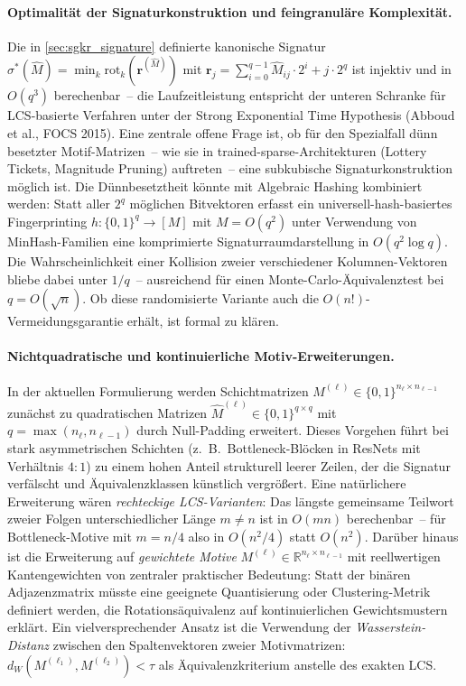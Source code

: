 ﻿\documentclass[12pt, a4paper, openany]{report}
\newcommand{\R}{\mathbb{R}}
\begin{document}
\paragraph{Optimalität der Signaturkonstruktion und feingranuläre Komplexität.}
Die in \cref{sec:sgkr_signature} definierte kanonische Signatur
$\sigma^*(\hat{M}) = \min_{k} \mathrm{rot}_k(\bm{r}^{(\hat{M})})$ mit
$\bm{r}_j = \sum_{i=0}^{q-1} \hat{M}_{ij}\cdot 2^i + j\cdot 2^q$
ist injektiv und in $O(q^3)$ berechenbar~-- die Laufzeitleistung entspricht
der unteren Schranke für LCS-basierte Verfahren unter der Strong Exponential
Time Hypothesis (Abboud et al., FOCS 2015).  Eine zentrale offene Frage ist,
ob für den Spezialfall dünn besetzter Motif-Matrizen~-- wie sie in
trained-sparse-Architekturen (Lottery Tickets, Magnitude Pruning) auftreten~--
eine subkubische Signaturkonstruktion möglich ist.  Die Dünnbesetztheit könnte
mit Algebraic Hashing kombiniert werden: Statt aller $2^q$ möglichen
Bitvektoren erfasst ein universell-hash-basiertes Fingerprinting
$h\colon \{0,1\}^q \to [M]$ mit $M = O(q^2)$ unter Verwendung von
MinHash-Familien eine komprimierte Signaturraumdarstellung in $O(q^2\log q)$.
Die Wahrscheinlichkeit einer Kollision zweier verschiedener Kolumnen-Vektoren
bliebe dabei unter $1/q$~-- ausreichend für einen Monte-Carlo-Äquivalenztest
bei $q = O(\sqrt{n})$.  Ob diese randomisierte Variante auch die
$O(n!)$-Vermeidungsgarantie erhält, ist formal zu klären.

\paragraph{Nichtquadratische und kontinuierliche Motiv-Erweiterungen.}
In der aktuellen Formulierung werden Schichtmatrizen $M^{(\ell)} \in
\{0,1\}^{n_\ell \times n_{\ell-1}}$ zunächst zu quadratischen Matrizen
$\hat{M}^{(\ell)} \in \{0,1\}^{q\times q}$ mit $q = \max(n_\ell, n_{\ell-1})$
durch Null-Padding erweitert.  Dieses Vorgehen führt bei stark asymmetrischen
Schichten (z.~B.\ Bottleneck-Blöcken in ResNets mit Verhältnis $4:1$) zu
einem hohen Anteil strukturell leerer Zeilen, der die Signatur verfälscht
und Äquivalenzklassen künstlich vergrößert.  Eine natürlichere Erweiterung
wären \emph{rechteckige LCS-Varianten}: Das längste gemeinsame Teilwort
zweier Folgen unterschiedlicher Länge $m \neq n$ ist in $O(mn)$ berechenbar~--
für Bottleneck-Motive mit $m = n/4$ also in $O(n^2/4)$ statt $O(n^2)$.
Darüber hinaus ist die Erweiterung auf \emph{gewichtete Motive}
$M^{(\ell)} \in \R^{n_\ell \times n_{\ell-1}}$ mit reellwertigen
Kantengewichten von zentraler praktischer Bedeutung: Statt der binären
Adjazenzmatrix müsste eine geeignete Quantisierung oder Clustering-Metrik
definiert werden, die Rotationsäquivalenz auf kontinuierlichen Gewichtsmustern
erklärt.  Ein vielversprechender Ansatz ist die Verwendung der
\emph{Wasserstein-Distanz} zwischen den Spaltenvektoren zweier
Motivmatrizen: $d_W(M^{(\ell_1)}, M^{(\ell_2)}) < \tau$ als
Äquivalenzkriterium anstelle des exakten LCS.
\end{document}
